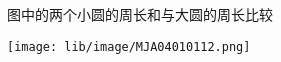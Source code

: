 图中的两个小圆的周长和与大圆的周长比较\key{}
\begin{center}
    \texttt{[image: lib/image/MJA04010112.png]}
\end{center}